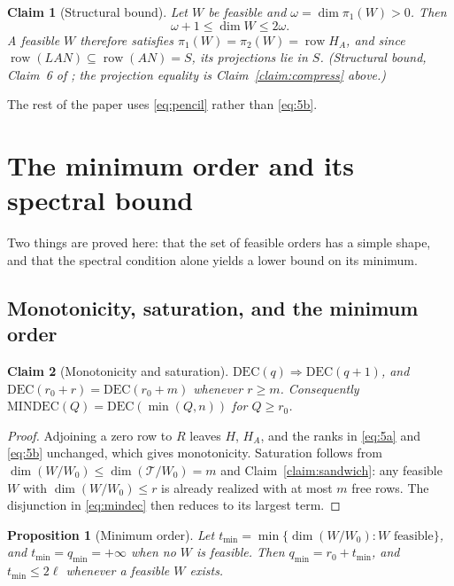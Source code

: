 ﻿\documentclass[journal]{IEEEtran}
\theoremstyle{plainn}
\newtheorem{prop}[thm]{Proposition}
\newtheorem{claim}{Claim}
\theoremstyle{remark}
\begin{document}
\begin{claim}[Structural bound]\label{claim:struct}
Let $W$ be feasible and $\omega=\dim\pi_1(W)>0$. Then
\begin{equation}\label{eq:struct}
\omega+1\le\dim W\le2\omega .
\end{equation}
A feasible $W$ therefore satisfies $\pi_1(W)=\pi_2(W)=\operatorname{row}H_A$, and since
$\operatorname{row}(LAN)\subseteq\operatorname{row}(AN)=S$, its projections lie in $S$. (Structural
bound, Claim~6 of \cite{companion1}; the projection equality is Claim~\ref{claim:compress} above.)
\end{claim}

The rest of the paper uses \eqref{eq:pencil} rather than \eqref{eq:5b}.



\section{The minimum order and its spectral bound}\label{sec:minorder}

Two things are proved here: that the set of feasible orders has a simple shape, and that the spectral
condition alone yields a lower bound on its minimum.

\subsection{Monotonicity, saturation, and the minimum order}\label{sec:monotone}

\begin{claim}[Monotonicity and saturation]\label{lem:monotone}
$\mathrm{DEC}(q)\Rightarrow\mathrm{DEC}(q+1)$, and $\mathrm{DEC}(r_0+r)=\mathrm{DEC}(r_0+m)$
whenever $r\ge m$. Consequently $\mathrm{MINDEC}(Q)=\mathrm{DEC}(\min(Q,n))$ for
$Q\ge r_0$.
\end{claim}

\begin{proof}
Adjoining a zero row to $R$ leaves $H$, $H_A$, and the ranks in \eqref{eq:5a} and
\eqref{eq:5b} unchanged, which gives monotonicity. Saturation follows from
$\dim(W/W_0)\le\dim(\mathcal T/W_0)=m$ and Claim~\ref{claim:sandwich}: any feasible $W$ with
$\dim(W/W_0)\le r$ is already realized with at most $m$ free rows. The disjunction in
\eqref{eq:mindec} then reduces to its largest term.
\end{proof}

\begin{prop}[Minimum order]\label{prop:minorder}
Let $t_{\min}=\min\{\dim(W/W_0):W \text{ feasible}\}$, and $t_{\min}=q_{\min}=+\infty$ when no $W$
is feasible. Then $q_{\min}=r_0+t_{\min}$, and $t_{\min}\le2\ell$ whenever a feasible $W$ exists.
\end{prop}
\end{document}
